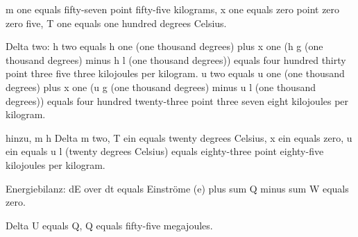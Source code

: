 m one equals fifty-seven point fifty-five kilograms, x one equals zero point zero zero five, T one equals one hundred degrees Celsius.

Delta two:
h two equals h one (one thousand degrees) plus x one (h g (one thousand degrees) minus h l (one thousand degrees)) equals four hundred thirty point three five three kilojoules per kilogram.
u two equals u one (one thousand degrees) plus x one (u g (one thousand degrees) minus u l (one thousand degrees)) equals four hundred twenty-three point three seven eight kilojoules per kilogram.

hinzu, m h Delta m two, T ein equals twenty degrees Celsius, x ein equals zero, u ein equals u l (twenty degrees Celsius) equals eighty-three point eighty-five kilojoules per kilogram.

Energiebilanz:
dE over dt equals Einströme (e) plus sum Q minus sum W equals zero.

Delta U equals Q, Q equals fifty-five megajoules.